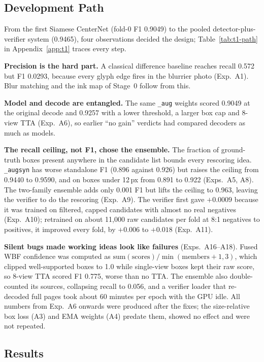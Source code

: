 \subsection{Development Path}
\label{sec:t1-experiments}

From the first Siamese CenterNet (fold-0 F1 0.9049) to the pooled detector-plus-verifier
system (0.9465), four observations decided the design; Table~\ref{tab:t1-path} in
Appendix~\ref{app:t1} traces every step.


\noindent\textbf{Precision is the hard part.} A classical difference baseline reaches
recall 0.572 but F1 0.0293, because every glyph edge fires in the blurrier photo
(Exp.~A1). Blur matching and the ink map of Stage~0 follow from this.

\noindent\textbf{Model and decode are entangled.} The same \texttt{\_aug} weights
scored 0.9049 at the original decode and 0.9257 with a lower threshold, a larger box
cap and 8-view TTA (Exp.~A6), so earlier ``no gain'' verdicts had compared decoders as
much as models.

\noindent\textbf{The recall ceiling, not F1, chose the ensemble.} The fraction of
ground-truth boxes present anywhere in the candidate list bounds every rescoring
idea. \texttt{\_augsyn} has worse standalone F1 (0.896 against 0.926) but raises the
ceiling from 0.9440 to 0.9590, and on boxes under 12\,px from 0.891 to 0.922
(Exps.~A5, A8). The two-family ensemble adds only 0.001 F1 but lifts the ceiling to
0.963, leaving the verifier to do the rescoring (Exp.~A9). The verifier first gave
$+0.0009$ because it was trained on filtered, capped candidates with almost no real
negatives (Exp.~A10); retrained on about 11{,}000 raw candidates per fold at 8:1
negatives to positives, it improved every fold, by $+0.006$ to $+0.018$ (Exp.~A11).

\noindent\textbf{Silent bugs made working ideas look like failures} (Exps.~A16--A18).
Fused WBF confidence was computed as
$\mathrm{sum(scores)}/\min(\mathrm{members}{+}1,3)$, which clipped well-supported boxes
to 1.0 while single-view boxes kept their raw score, so 8-view TTA scored F1 0.775,
worse than no TTA. The ensemble also double-counted its sources, collapsing recall to
0.056, and a verifier loader that re-decoded full pages took about 60 minutes per epoch
with the GPU idle. All numbers from Exp.~A6 onwards were produced after the fixes;
the size-relative box loss (A3) and EMA weights (A4) predate them, showed no effect and
were not repeated.

\subsection{Results}
\label{sec:t1-results}

